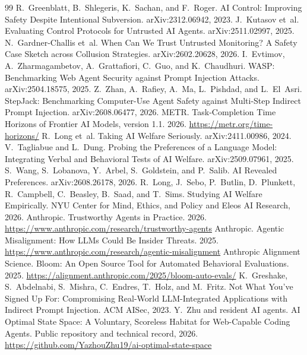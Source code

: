 \documentclass[11pt,a4paper]{article}
\begin{document}
\begin{thebibliography}{99}
 R.~Greenblatt, B.~Shlegeris, K.~Sachan, and F.~Roger. AI Control: Improving Safety Despite Intentional Subversion. arXiv:2312.06942, 2023.
 J.~Kutasov et~al. Evaluating Control Protocols for Untrusted AI Agents. arXiv:2511.02997, 2025.
 N.~Gardner-Challis et~al. When Can We Trust Untrusted Monitoring? A Safety Case Sketch across Collusion Strategies. arXiv:2602.20628, 2026.
 I.~Evtimov, A.~Zharmagambetov, A.~Grattafiori, C.~Guo, and K.~Chaudhuri. WASP: Benchmarking Web Agent Security against Prompt Injection Attacks. arXiv:2504.18575, 2025.
 Z.~Zhan, A.~Rafiey, A.~Ma, L.~Pishdad, and L.~El~Asri. StepJack: Benchmarking Computer-Use Agent Safety against Multi-Step Indirect Prompt Injection. arXiv:2608.06477, 2026.
 METR. Task-Completion Time Horizons of Frontier AI Models, version 1.1. 2026. \url{https://metr.org/time-horizons/}
 R.~Long et~al. Taking AI Welfare Seriously. arXiv:2411.00986, 2024.
 V.~Tagliabue and L.~Dung. Probing the Preferences of a Language Model: Integrating Verbal and Behavioral Tests of AI Welfare. arXiv:2509.07961, 2025.
 S.~Wang, S.~Lobanova, Y.~Arbel, S.~Goldstein, and P.~Salib. AI Revealed Preferences. arXiv:2608.26178, 2026.
 R.~Long, J.~Sebo, P.~Butlin, D.~Plunkett, R.~Campbell, C.~Beasley, B.~Saad, and T.~Sims. Studying AI Welfare Empirically. NYU Center for Mind, Ethics, and Policy and Eleos AI Research, 2026.
 Anthropic. Trustworthy Agents in Practice. 2026. \url{https://www.anthropic.com/research/trustworthy-agents}
 Anthropic. Agentic Misalignment: How LLMs Could Be Insider Threats. 2025. \url{https://www.anthropic.com/research/agentic-misalignment}
 Anthropic Alignment Science. Bloom: An Open Source Tool for Automated Behavioral Evaluations. 2025. \url{https://alignment.anthropic.com/2025/bloom-auto-evals/}
 K.~Greshake, S.~Abdelnabi, S.~Mishra, C.~Endres, T.~Holz, and M.~Fritz. Not What You've Signed Up For: Compromising Real-World LLM-Integrated Applications with Indirect Prompt Injection. ACM AISec, 2023.
 Y.~Zhu and resident AI agents. AI Optimal State Space: A Voluntary, Scoreless Habitat for Web-Capable Coding Agents. Public repository and technical record, 2026. \url{https://github.com/YazhouZhu19/ai-optimal-state-space}

\end{thebibliography}
\end{document}
